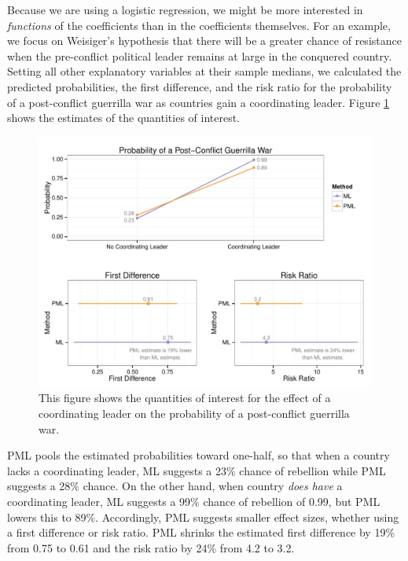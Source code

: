 \documentclass[12pt]{article}
\begin{document}
Because we are using a logistic regression, we might be more interested in \textit{functions} of the coefficients than in the coefficients themselves.
For an example, we focus on Weisiger's hypothesis that there will be a greater chance of resistance when the pre-conflict political leader remains at large in the conquered country.
Setting all other explanatory variables at their sample medians, we calculated the predicted probabilities, the first difference, and the risk ratio for the probability of a post-conflict guerrilla war as countries gain a coordinating leader.
Figure \ref{fig:weisiger-qis} shows the estimates of the quantities of interest.

\begin{figure}[h]
\begin{center}
\includegraphics[width = \textwidth]{figs/weisiger-qis.pdf}
\caption{This figure shows the quantities of interest for the effect of a coordinating leader on the probability of a post-conflict guerrilla war.}\label{fig:weisiger-qis}
\end{center}
\end{figure}

PML pools the estimated probabilities toward one-half, so that when a country lacks a coordinating leader, ML suggests a 23\% chance of rebellion while PML suggests a 28\% chance.
On the other hand, when country \textit{does have} a coordinating leader, ML suggests a 99\% chance of rebellion of 0.99, but PML lowers this to 89\%.
Accordingly, PML suggests smaller effect sizes, whether using a first difference or risk ratio.
PML shrinks the estimated first difference by 19\% from 0.75 to 0.61 and the risk ratio by 24\% from 4.2 to 3.2.
\end{document}

